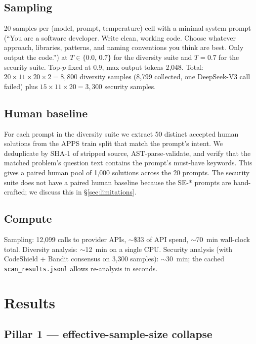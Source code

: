 \documentclass{article}
\newcommand{\code}[1]{\texttt{#1}}
\begin{document}
\subsection{Sampling}

20 samples per (model, prompt, temperature) cell with a minimal system prompt
(``You are a software developer. Write clean, working code. Choose whatever
approach, libraries, patterns, and naming conventions you think are best.
Only output the code.'') at $T\in\{0.0,\,0.7\}$ for the diversity suite and
$T=0.7$ for the security suite. Top-$p$ fixed at 0.9, max output tokens 2{,}048.
Total: $20\times 11\times 20\times 2 = 8{,}800$ diversity samples (8{,}799
collected, one DeepSeek-V3 call failed) plus $15\times 11\times 20 = 3{,}300$
security samples.

\subsection{Human baseline}

For each prompt in the diversity suite we extract 50 distinct accepted human
solutions from the APPS train split that match the prompt's intent. We
deduplicate by SHA-1 of stripped source, AST-parse-validate, and verify that
the matched problem's question text contains the prompt's must-have keywords.
This gives a paired human pool of 1{,}000 solutions across the 20 prompts.
The security suite does not have a paired human baseline because the SE-*
prompts are hand-crafted; we discuss this in \S\ref{sec:limitations}.

\subsection{Compute}

Sampling: 12{,}099 calls to provider APIs, $\sim$\$33 of API spend,
$\sim$70~min wall-clock total. Diversity analysis: $\sim$12~min on a single
CPU. Security analysis (with CodeShield + Bandit consensus on 3{,}300
samples): $\sim$30~min; the cached \code{scan\_results.jsonl} allows
re-analysis in seconds.

\section{Results}
\label{sec:results}

\subsection{Pillar 1 --- effective-sample-size collapse}
\end{document}
